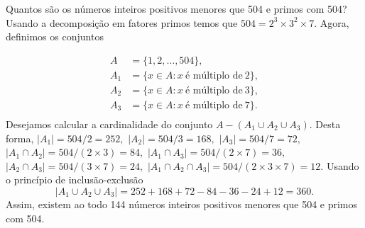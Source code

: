 \begin{frame}
\begin{exem}
Quantos são os números inteiros positivos menores que 504 e primos com 504? 
Usando a decomposição em fatores primos temos que $504 = 2^3 \times 3^2 \times 7.$ Agora, definimos os conjuntos 

$$
\begin{aligned}
A & = \{1, 2, \ldots , 504\},\\
A_1 &= \{x \in A : x \ \text{é múltiplo de} \ 2\},\\
A_2 &= \{x \in A : x \ \text{é múltiplo de} \ 3\}, \\
A_3 &= \{x \in A : x \ \text{é múltiplo de} \ 7\}. \\
\end{aligned}
$$
Desejamos calcular a cardinalidade do conjunto $A - (A_1 \cup A_2 \cup A_3 )$. Desta forma, 
$|A_1|= 504/2 = 252,$
$|A_2|= 504/3 = 168,$ 
$|A_3|= 504/7 = 72,$ 
$|A_1 \cap A_2 | = 504/ (2\times 3) = 84,$ 
$|A_1 \cap A_3| = 504/  (2\times 7) = 36,$ 
$|A_2 \cap A_3 | = 504/ (3\times 7)=  24,$  
$|A_1 \cap A_2 \cap A_3 | = 504/ (2\times 3\times 7)=  12. $ 
Usando o princípio de inclusão-exclusão
$$|A_1 \cup A_2 \cup A_3 | = 252 + 168 + 72 - 84 - 36 - 24 + 12 = 360.$$
Assim, existem ao todo 144 números inteiros positivos menores que 504 e primos com 504.
\end{exem}
\end{frame}



